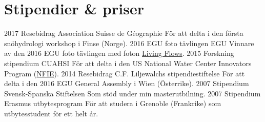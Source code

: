 \ifswedish
  \section{Stipendier \& priser}
    \position
      {2017}
      {Resebidrag}
      {Association Suisse de Géographie}
      {För att delta i den första snöhydrologi workshop i Finse (Norge).}
    \position
      {2016}
      {EGU foto tävlingen}
      {EGU}
      {Vinnare av den 2016 EGU foto tävlingen med foton \href{https://blogs.egu.eu/geolog/2016/08/29/imaggeo-on-mondays-living-flows/}{Living Flows}.}
    \position
      {2015}
      {Forskning stipendium}
      {CUAHSI}
      {För att delta i den US National Water Center Innovators Program  (\href{https://www.cuahsi.org/education/summerinstitute/}{NFIE}).}
    \position
      {2014}
      {Resebidrag}
      {C.F. Liljewalchs stipendiestiftelse}
      {För att delta i den 2016 EGU General Assembly i Wien (Österrike).}
    \position
      {2007}
      {Stipendium}
      {Svensk-Spanska Stiftelsen}
      {Som stöd under min masterutbilning.}
    \position
      {2007}
      {Stipendium}
      {Erasmus utbytesprogram}
      {För att studera i Grenoble (Frankrike) som utbytesstudent för ett helt år.}
\else
